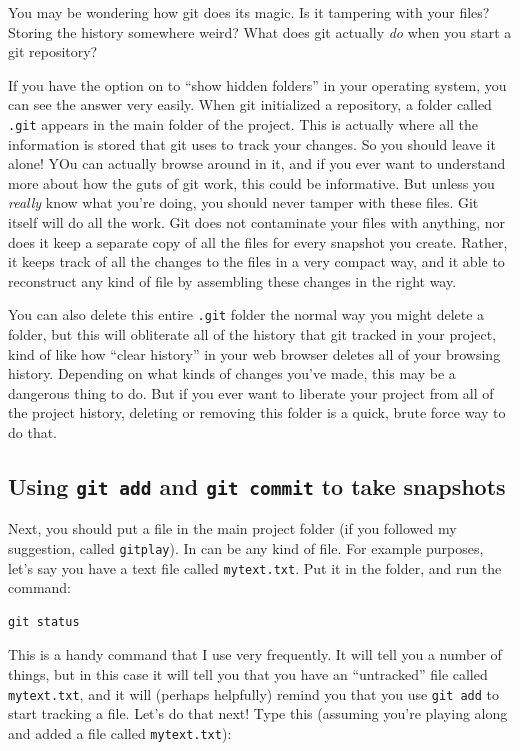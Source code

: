 \documentclass{article}
\begin{document}
You may be wondering how git does its magic. Is it tampering with your files? Storing the history somewhere weird? What does git actually \emph{do} when you start a git repository?

If you have the option on to ``show hidden folders'' in your operating system, you can see the answer very easily. When git initialized a repository, a folder called \texttt{.git} appears in the main folder of the project. This is actually where all the information is stored that git uses to track your changes. So you should leave it alone!  YOu can actually browse around in it, and if you ever want to understand more about how the guts of git work, this could be informative. But unless you \emph{really} know what you're doing, you should never tamper with these files. Git itself will do all the work.  Git does not contaminate your files with anything, nor does it keep a separate copy of all the files for every snapshot you create. Rather, it keeps track of all the changes to the files in a very compact way, and it able to reconstruct any kind of file by assembling these changes in the right way.

You can also delete this entire \texttt{.git} folder the normal way you might delete a folder, but this will obliterate all of the history that git tracked in your project, kind of like how ``clear history'' in your web browser deletes all of your browsing history. Depending on what kinds of changes you've made, this may be a dangerous thing to do.  But if you ever want to liberate your project from all of the project history, deleting or removing this folder is a quick, brute force way to do that. 
\subsection{Using \texttt{git add} and \texttt{git commit} to take snapshots}
\label{sec-5-3}

Next, you should put a file in the main project folder (if you followed my suggestion, called \texttt{gitplay}). In can be any kind of file.  For example purposes, let's say you have a text file called \texttt{mytext.txt}.  Put it in the folder, and run the command:


\begin{verbatim}
git status
\end{verbatim}

This is a handy command that I use very frequently. It will tell you a number of things, but in this case it will tell you that you have an ``untracked'' file called \texttt{mytext.txt}, and it will (perhaps helpfully) remind you that you use \texttt{git add} to start tracking a file.  Let's do that next!  Type this (assuming you're playing along and added a file called \texttt{mytext.txt}):
\end{document}
